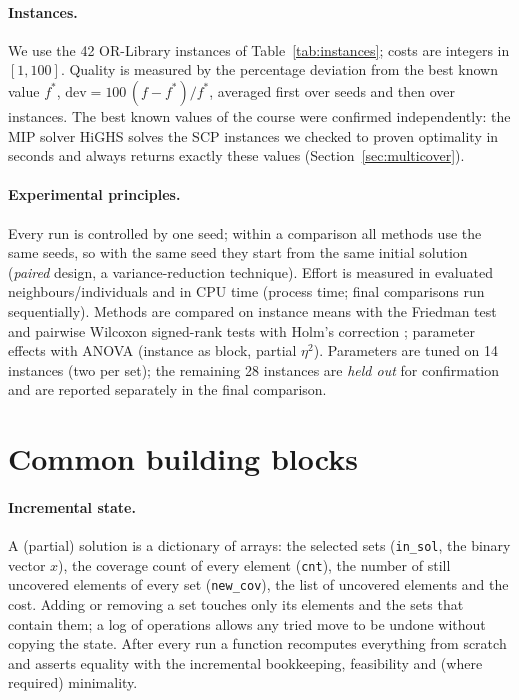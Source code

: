 \documentclass[11pt,a4paper]{article}
\newcommand{\dev}{\mathrm{dev}}
\begin{document}
\paragraph{Instances.} We use the 42 OR-Library instances \cite{beasley1990,beasley1987} of Table~\ref{tab:instances}; costs are integers in $[1,100]$.
Quality is measured by the percentage deviation from the best known value $f^*$, $\dev = 100\,(f-f^*)/f^*$, averaged first over seeds and then over instances.
The best known values of the course were confirmed independently: the MIP solver HiGHS \cite{huangfu2018} solves the SCP instances we checked to proven optimality in seconds and always returns exactly these values (Section~\ref{sec:multicover}).



\paragraph{Experimental principles.} Every run is controlled by one seed; within a comparison all methods use the same seeds, so with the same seed they start from the same initial solution (\emph{paired} design, a variance-reduction technique).
Effort is measured in evaluated neighbours/individuals and in CPU time (process time; final comparisons run sequentially).
Methods are compared on instance means with the Friedman test and pairwise Wilcoxon signed-rank tests with Holm's correction \cite{demsar2006,holm1979}; parameter effects with ANOVA (instance as block, partial $\eta^2$).
Parameters are tuned on 14 instances (two per set); the remaining 28 instances are \emph{held out} for confirmation and are reported separately in the final comparison.

\section{Common building blocks}\label{sec:blocks}
\paragraph{Incremental state.} A (partial) solution is a dictionary of arrays: the selected sets (\texttt{in\_sol}, the binary vector $x$), the coverage count of every element (\texttt{cnt}), the number of still uncovered elements of every set (\texttt{new\_cov}), the list of uncovered elements and the cost.
Adding or removing a set touches only its elements and the sets that contain them; a log of operations allows any tried move to be undone without copying the state.
After every run a function recomputes everything from scratch and asserts equality with the incremental bookkeeping, feasibility and (where required) minimality.
\end{document}
